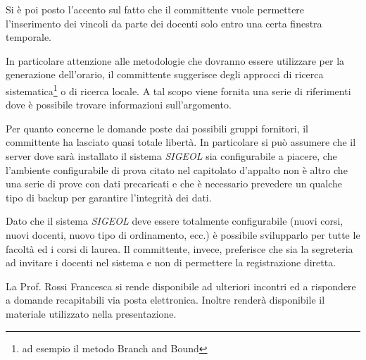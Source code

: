 \documentclass[11pt,a4paper]{article}
\begin{document}
Si è poi posto l'accento sul fatto che il committente vuole permettere l'inserimento dei vincoli da parte dei docenti solo entro una certa finestra temporale.

In particolare attenzione alle metodologie che dovranno essere utilizzare per la generazione dell'orario, il committente suggerisce degli approcci di ricerca sistematica\footnote{ad esempio il metodo Branch and Bound} o di ricerca locale. A tal scopo viene fornita una serie di riferimenti dove è possibile trovare informazioni sull'argomento.

Per quanto concerne le domande poste dai possibili gruppi fornitori, il committente ha lasciato quasi totale libertà. In particolare si può assumere che il server dove sarà installato il sistema \textit{SIGEOL} sia configurabile a piacere, che l'ambiente configurabile di prova citato nel capitolato d'appalto non è altro che una serie di prove con dati precaricati e che è necessario prevedere un qualche tipo di backup per garantire l'integrità dei dati.

Dato che il sistema \textit{SIGEOL} deve essere totalmente configurabile (nuovi corsi, nuovi docenti, nuovo tipo di ordinamento, ecc.) è possibile svilupparlo per tutte le facoltà ed i corsi di laurea. Il committente, invece, preferisce che sia la segreteria ad invitare i docenti nel sistema e non di permettere la registrazione diretta.

La Prof. Rossi Francesca si rende disponibile ad ulteriori incontri ed a rispondere a domande recapitabili via posta elettronica. Inoltre renderà disponibile il materiale utilizzato nella presentazione.
\end{document}
